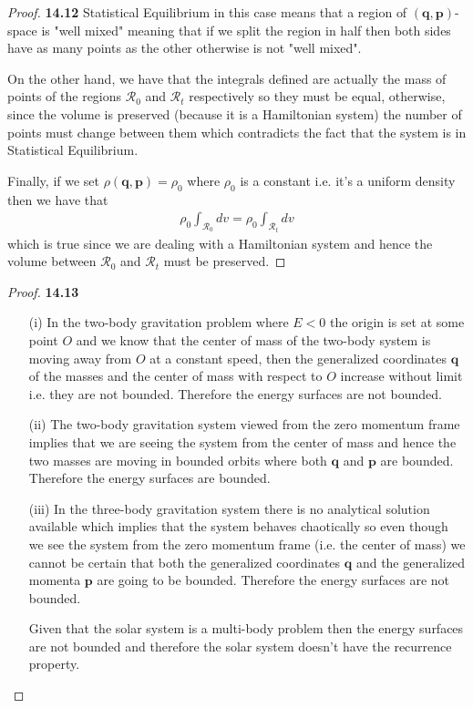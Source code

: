 \documentclass[11pt]{article}
\theoremstyle{definition}
\begin{document}
\begin{proof}{\textbf{14.12}}
    Statistical Equilibrium in this case means that a region of
    $(\bm{q}, \bm{p})$-space is "well mixed" meaning that if we split the
    region in half then both sides have as many points as the other otherwise
    is not "well mixed".
    
    On the other hand, we have that the integrals defined are actually the mass
    of points of the regions $\mathcal{R}_0$ and $\mathcal{R}_t$ respectively
    so they must be equal, otherwise, since the volume is
    preserved (because it is a Hamiltonian system) the number of points must
    change between them which contradicts the fact that the system is in
    Statistical Equilibrium.

    Finally, if we set $\rho(\bm{q}, \bm{p}) = \rho_0$ where $\rho_0$ is a
    constant i.e. it's a uniform density then we have that
    \begin{align*}
        \rho_0\int_{\mathcal{R}_0} dv = \rho_0\int_{\mathcal{R}_t} dv
    \end{align*}
    which is true since we are dealing with a Hamiltonian system and hence
    the volume between $\mathcal{R}_0$ and $\mathcal{R}_t$ must be preserved.
\end{proof}
\cleardoublepage
\begin{proof}{\textbf{14.13}}
\begin{itemize}
    \item [(i)] In the two-body gravitation problem where $E < 0$ the origin is
    set at some point $O$ and we know that the center of mass 
    of the two-body system is moving away from $O$ at a constant speed, then
    the generalized coordinates $\bm{q}$ of the masses and the center of mass
    with respect to $O$ increase without limit i.e. they
    are not bounded. Therefore the energy surfaces are not bounded.

    \item [(ii)] The two-body gravitation system viewed from the zero momentum
    frame implies that we are seeing the system from the center of mass
    and hence the two masses are moving in bounded orbits where
    both $\bm{q}$ and $\bm{p}$ are bounded. Therefore the energy surfaces are
    bounded.

    \item [(iii)] In the three-body gravitation system there is no analytical
    solution available which implies that the system behaves chaotically
    so even though we see the system from the zero momentum frame
    (i.e. the  center of mass) we cannot be certain that both the generalized
    coordinates $\bm{q}$ and the generalized momenta $\bm{p}$ are going to be
    bounded. Therefore the energy surfaces are not bounded.

    Given that the solar system is a multi-body problem then the energy
    surfaces are not bounded and therefore the solar system doesn't have
    the recurrence property.
\end{itemize}
\end{proof}
\end{document}
